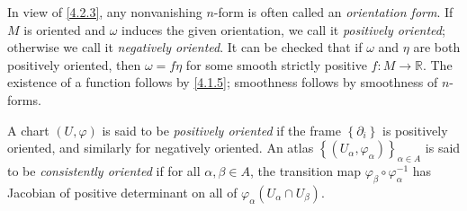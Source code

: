 In view of \cref{4.2.3}, any nonvanishing $n$-form is often called an \emph{orientation form}. If $M$ is oriented and $\omega $ induces the given orientation, we call it \emph{positively oriented}; otherwise we call it \emph{negatively oriented}. It can be checked that if $\omega $ and $\eta $ are both positively oriented, then $\omega =f\eta $ for some smooth strictly positive $f : M \to \mathbb{R} $. The existence of a function follows by \cref{4.1.5}; smoothness follows by smoothness of $n$-forms.

\begin{terminology}\label{4.2.4}
	A chart $(U,\varphi )$ is said to be \emph{positively oriented} if the frame $\left\{ \partial _i \right\} $ is positively oriented, and similarly for negatively oriented. An atlas $\left\{ (U_\alpha ,\varphi _\alpha ) \right\} _{\alpha \in A} $ is said to be \emph{consistently oriented} if for all $\alpha ,\beta \in A$, the transition map $\varphi _\beta \circ \varphi _\alpha ^{-1} $ has Jacobian of positive determinant on all of $\varphi _\alpha (U_\alpha \cap U_\beta )$.
\end{terminology}

